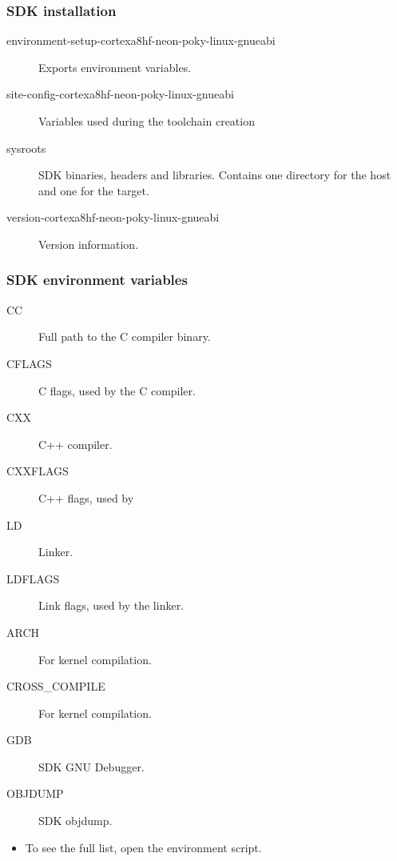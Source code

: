 \begin{frame}
  \frametitle{SDK installation}
  \begin{description}
    \item[environment-setup-cortexa8hf-neon-poky-linux-gnueabi] Exports environment
      variables.
    \item[site-config-cortexa8hf-neon-poky-linux-gnueabi] Variables used during the
      toolchain creation
    \item[sysroots] SDK binaries, headers and libraries. Contains
      one directory for the host and one for the target.
    \item[version-cortexa8hf-neon-poky-linux-gnueabi] Version information.
  \end{description}
\end{frame}

\begin{frame}
  \frametitle{SDK environment variables}
  \begin{description}
    \item[CC] Full path to the C compiler binary.
    \item[CFLAGS] C flags, used by the C compiler.
    \item[CXX] C++ compiler.
    \item[CXXFLAGS] C++ flags, used by 
    \item[LD] Linker.
    \item[LDFLAGS] Link flags, used by the linker.
    \item[ARCH] For kernel compilation.
    \item[CROSS\_COMPILE] For kernel compilation.
    \item[GDB] SDK GNU Debugger.
    \item[OBJDUMP] SDK objdump.
  \end{description}
  \begin{itemize}
    \item To see the full list, open the environment script.
  \end{itemize}
\end{frame}

